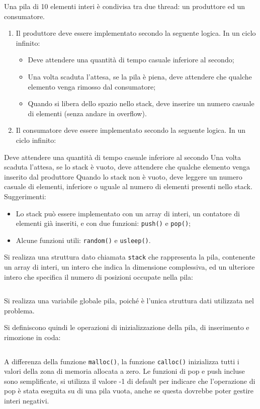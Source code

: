 \documentclass{article}
\numberwithin{equation}{subsection}
\begin{document}
Una pila di 10 elementi interi è condivisa tra due thread: un produttore ed un consumatore. 
\begin{enumerate}
    \item Il produttore deve essere implementato secondo la seguente logica. In un ciclo infinito:
    \begin{itemize}
        \item Deve attendere una quantità di tempo casuale inferiore al secondo;
        \item Una volta scaduta l'attesa, se la pila è piena, deve attendere che qualche elemento venga rimosso dal consumatore;
        \item Quando si libera dello spazio nello stack, deve inserire un numero casuale di elementi (senza andare in overflow).
    \end{itemize}
    \item Il consumatore deve essere implementato secondo la seguente logica. In un ciclo infinito:
\end{enumerate}
Deve attendere una quantità di tempo casuale inferiore al secondo
Una volta scaduta l'attesa, se lo stack è vuoto, deve attendere che qualche elemento venga inserito dal produttore
Quando lo stack non è vuoto, deve leggere un numero casuale di elementi, inferiore o uguale al numero di elementi presenti nello stack.
Suggerimenti:
\begin{itemize}
    \item Lo stack può essere implementato con un array di interi, un contatore di elementi già inseriti, e con due funzioni: \verb|push()| e \verb|pop()|;
    \item Alcune funzioni utili: \verb|random()| e \verb|usleep()|.  
\end{itemize}

Si realizza una struttura dato chiamata \verb|stack| che rappresenta la pila, 
contenente un array di interi, un intero che indica la dimensione complessiva, ed un 
ulteriore intero che specifica il numero di posizioni occupate nella pila:
\inputminted[firstline=1, lastline=14]{c}{./Programmazione Concorrente/consumatore_produttore.c}
Si realizza una variabile globale 
pila, poiché è l'unica struttura dati utilizzata nel problema. 

Si definiscono quindi le operazioni di inizializzazione della pila, di inserimento e rimozione 
in coda:
\inputminted[firstline=16, lastline=36]{c}{./Programmazione Concorrente/consumatore_produttore.c}
A differenza della funzione \verb|malloc()|, la funzione \verb|calloc()| inizializza 
tutti i valori della zona di memoria allocata a zero. Le funzioni di pop e 
push incluse sono semplificate, si utilizza il valore -1 di default per indicare 
che l'operazione di pop è stata eseguita su di una pila vuota, anche se questa dovrebbe 
poter gestire interi negativi. 
\end{document}

